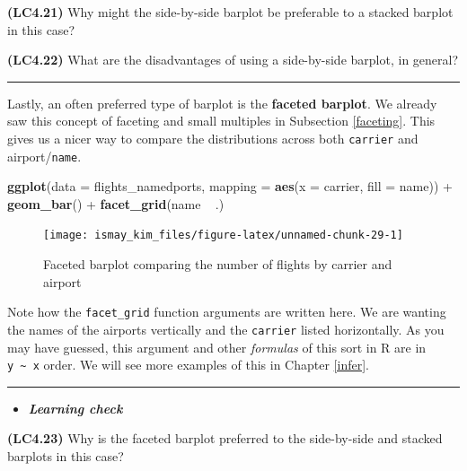 \documentclass[]{tufte-book}
\newenvironment{Shaded}{\begin{snugshade}}{\end{snugshade}}
\newcommand{\KeywordTok}[1]{\textcolor[rgb]{0.13,0.29,0.53}{\textbf{{#1}}}}
\newcommand{\DataTypeTok}[1]{\textcolor[rgb]{0.13,0.29,0.53}{{#1}}}
\newcommand{\StringTok}[1]{\textcolor[rgb]{0.31,0.60,0.02}{{#1}}}
\newcommand{\NormalTok}[1]{{#1}}
\newenvironment{rmdblock}[1]
  {\begin{shaded*}
  \begin{itemize}
  \renewcommand{\labelitemi}{
    \raisebox{-.7\height}[0pt][0pt]{
    }
  }
  \item
  }
  {
  \end{itemize}
  \end{shaded*}
  }
\newenvironment{learncheck}
  {\begin{rmdblock}{warning}}
  {\end{rmdblock}}
\begin{document}
\textbf{(LC4.21)} Why might the side-by-side barplot be preferable to a
stacked barplot in this case?

\textbf{(LC4.22)} What are the disadvantages of using a side-by-side
barplot, in general?

\begin{center}\rule{0.5\linewidth}{\linethickness}\end{center}

Lastly, an often preferred type of barplot is the \textbf{faceted
barplot}. We already saw this concept of faceting and small multiples in
Subsection \ref{faceting}. This gives us a nicer way to compare the
distributions across both \texttt{carrier} and airport/\texttt{name}.

\begin{Shaded}
\begin{Highlighting}[]
\KeywordTok{ggplot}\NormalTok{(}\DataTypeTok{data =} \NormalTok{flights_namedports, }\DataTypeTok{mapping =} \KeywordTok{aes}\NormalTok{(}\DataTypeTok{x =} \NormalTok{carrier, }\DataTypeTok{fill =} \NormalTok{name)) +}
\StringTok{  }\KeywordTok{geom_bar}\NormalTok{() +}
\StringTok{  }\KeywordTok{facet_grid}\NormalTok{(name ~}\StringTok{ }\NormalTok{.)}
\end{Highlighting}
\end{Shaded}

\begin{figure}
\texttt{[image: ismay\_kim\_files/figure-latex/unnamed-chunk-29-1]} \caption[Faceted barplot comparing the number of flights by carrier and airport]{Faceted barplot comparing the number of flights by carrier and airport}\label{fig:unnamed-chunk-29}
\end{figure}

Note how the \texttt{facet\_grid} function arguments are written here.
We are wanting the names of the airports vertically and the
\texttt{carrier} listed horizontally. As you may have guessed, this
argument and other \emph{formulas} of this sort in R are in
\texttt{y\ \textasciitilde{}\ x} order. We will see more examples of
this in Chapter \ref{infer}.

\begin{center}\rule{0.5\linewidth}{\linethickness}\end{center}

\begin{learncheck}
\textbf{\emph{Learning check}}
\end{learncheck}

\textbf{(LC4.23)} Why is the faceted barplot preferred to the
side-by-side and stacked barplots in this case?
\end{document}
